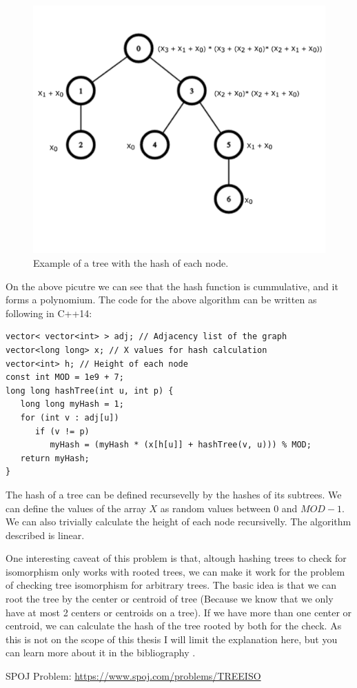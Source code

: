 \begin{figure}[h!]
  \centering
  \includegraphics[width=12.5cm]{figuras/treeIsomorphism.png}
  \caption{Example of a tree with the hash of each node. }
\end{figure}

On the above picutre we can see that the hash function is cummulative, and it forms a polynomium. The code for the above algorithm can be written as following in C++14:

\begin{lstlisting}
vector< vector<int> > adj; // Adjacency list of the graph
vector<long long> x; // X values for hash calculation
vector<int> h; // Height of each node
const int MOD = 1e9 + 7;
long long hashTree(int u, int p) {
   long long myHash = 1;
   for (int v : adj[u])
      if (v != p)
         myHash = (myHash * (x[h[u]] + hashTree(v, u))) % MOD;
   return myHash;
}
\end{lstlisting}

The hash of a tree can be defined recursevelly by the hashes of its subtrees. We can define the values of the array \( X \) as random values between \( 0 \) and \( MOD - 1 \). We can also trivially calculate the height of each node recursivelly. The algorithm described is linear.

One interesting caveat of this problem is that, altough hashing trees to check for isomorphism only works with rooted trees, we can make it work for the problem of checking tree isomorphism for arbitrary trees. The basic idea is that we can root the tree by the center or centroid of tree (Because we know that we only have at most 2 centers or centroids on a tree). If we have more than one center or centroid, we can calculate the hash of the tree rooted by both for the check. As this is not on the scope of this thesis I will limit the explanation here, but you can learn more about it in the bibliography \cite{Centroid}.

SPOJ Problem: \url{https://www.spoj.com/problems/TREEISO}

